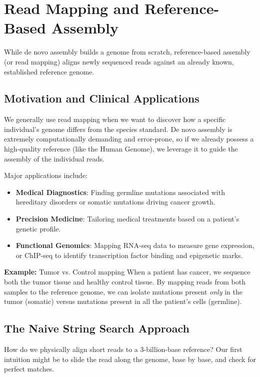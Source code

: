 \documentclass[11pt,a4paper]{article}
\begin{document}
\section{Read Mapping and Reference-Based Assembly}

While de novo assembly builds a genome from scratch, reference-based assembly (or read mapping) aligns newly sequenced reads against an already known, established reference genome.

\subsection{Motivation and Clinical Applications}

We generally use read mapping when we want to discover how a specific individual's genome differs from the species standard. 
De novo assembly is extremely computationally demanding and error-prone, so if we already possess a high-quality reference (like the Human Genome), we leverage it to guide the assembly of the individual reads.

Major applications include:
\begin{itemize}
    \item \textbf{Medical Diagnostics}: Finding germline mutations associated with hereditary disorders or somatic mutations driving cancer growth. 
    \item \textbf{Precision Medicine}: Tailoring medical treatments based on a patient's genetic profile.
    \item \textbf{Functional Genomics}: Mapping RNA-seq data to measure gene expression, or ChIP-seq to identify transcription factor binding and epigenetic marks.
\end{itemize}

\textbf{Example:} Tumor vs. Control mapping
When a patient has cancer, we sequence both the tumor tissue and healthy control tissue. By mapping reads from both samples to the reference genome, we can isolate mutations present \textit{only} in the tumor (somatic) versus mutations present in all the patient's cells (germline).

\subsection{The Naive String Search Approach}

How do we physically align short reads to a 3-billion-base reference? Our first intuition might be to slide the read along the genome, base by base, and check for perfect matches.
\end{document}
